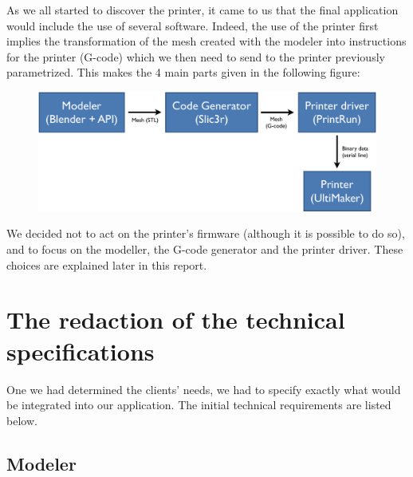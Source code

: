 \documentclass{report}
\begin{document}
As we all started to discover the printer, it came to us that the final application would include the use of several software. Indeed, the use of the printer first implies the transformation of the mesh created with the modeler into instructions for the printer (G-code) which we then need to send to the printer previously parametrized. This makes the 4 main parts given in the following figure:

\bigskip

\begin{figure}[!h]

\begin{center}
	\includegraphics[width=.7\textwidth]{schema}
\end{center}

\end{figure}

We decided not to act on the printer's firmware (although it is possible to do so), and to focus on the modeller, the G-code generator and the printer driver. These choices are explained later in this report. 

\section{The redaction of the technical specifications}

One we had determined the clients' needs, we had to specify exactly what would be integrated into our application. The initial technical requirements are listed below.

\subsection{Modeler}

\bigskip
\end{document}
